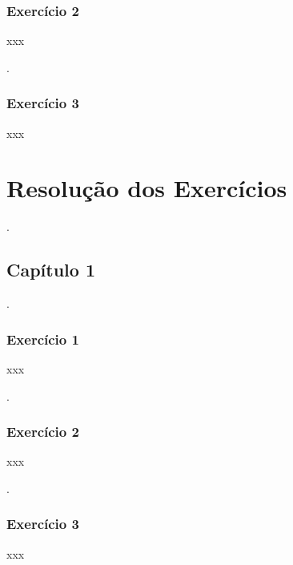 \documentclass[
]{book}
\begin{document}
\hypertarget{exercuxedcio-2-1}{%
\subsection{Exercício 2}\label{exercuxedcio-2-1}}

xxx

.\linebreak

\hypertarget{exercuxedcio-3}{%
\subsection{Exercício 3}\label{exercuxedcio-3}}

xxx

\hypertarget{resoluuxe7uxe3o-dos-exercuxedcios}{%
\chapter{Resolução dos Exercícios}\label{resoluuxe7uxe3o-dos-exercuxedcios}}

.\linebreak

\hypertarget{capuxedtulo-1-1}{%
\section{Capítulo 1}\label{capuxedtulo-1-1}}

.\linebreak

\hypertarget{exercuxedcio-1-2}{%
\subsection{Exercício 1}\label{exercuxedcio-1-2}}

xxx

.\linebreak

\hypertarget{exercuxedcio-2-2}{%
\subsection{Exercício 2}\label{exercuxedcio-2-2}}

xxx

.\linebreak

\hypertarget{exercuxedcio-3-1}{%
\subsection{Exercício 3}\label{exercuxedcio-3-1}}

xxx
\end{document}
